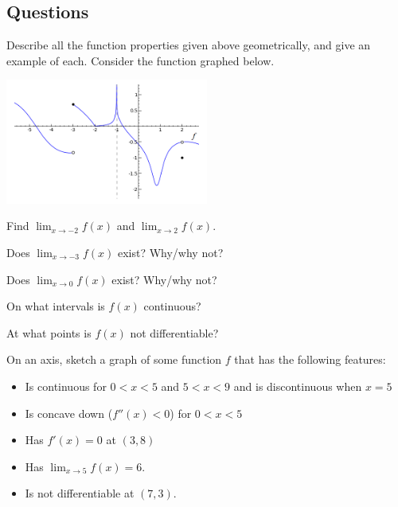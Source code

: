 \subsection*{Questions}
\begin{questions}
  \question Describe all the function properties given above geometrically, and give an example of each.
  \question Consider the function graphed below.

            \begin{center}
              \includegraphics[width=0.5\textwidth]{limits3}
            \end{center}
    \begin{parts}
      \item Find $ \lim_{x \to -2} f(x) $ and $ \lim_{x \to 2} f(x) $.
      \item Does $ \lim_{x \to -3} f(x) $ exist? Why/why not?
      \item Does $ \lim_{x \to 0} f(x) $ exist? Why/why not?
      \item On what intervals is $ f(x) $ continuous?
      \item At what points is $ f(x) $ not differentiable?
    \end{parts}
  \question On an axis, sketch a graph of some function $ f $ that has the following features:
            \begin{itemize}[noitemsep]
              \item Is continuous for $ 0 < x < 5 $ and $ 5 < x < 9 $ and is discontinuous when $ x = 5 $
              \item Is concave down ($f''(x) < 0 $) for $ 0 < x < 5 $
              \item Has $ f'(x) = 0 $ at $ (3, 8) $
              \item Has $ \lim_{x \to 5} f(x) = 6 $.
              \item Is not differentiable at $ (7, 3) $.
            \end{itemize}
\end{questions}

